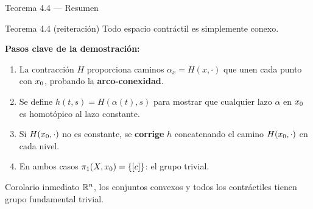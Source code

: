 \begin{frame}{Teorema 4.4 — Resumen}

  \begin{block}{Teorema 4.4 (reiteración)}
    Todo espacio contráctil es simplemente conexo.
  \end{block}

  \bigskip
  \textbf{Pasos clave de la demostración:}
  \begin{enumerate}
    \item La contracción $H$ proporciona caminos $\alpha_x = H(x,\cdot)$
          que unen cada punto con $x_0$, probando la \textbf{arco-conexidad}.
    \item Se define $h(t,s) = H(\alpha(t),s)$ para mostrar que cualquier
          lazo $\alpha$ en $x_0$ es homotópico al lazo constante.
    \item Si $H(x_0,\cdot)$ no es constante, se \textbf{corrige} $h$
          concatenando el camino $H(x_0,\cdot)$ en cada nivel.
    \item En ambos casos $\pi_1(X,x_0) = \{[c]\}$: el grupo trivial.
  \end{enumerate}

  \bigskip
  \begin{exampleblock}{Corolario inmediato}
    $\mathbb{R}^n$, los conjuntos convexos y todos los contráctiles tienen
    grupo fundamental trivial.
  \end{exampleblock}

\end{frame}
